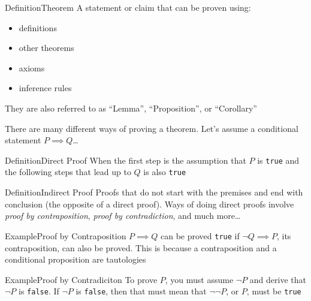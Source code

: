 \documentclass{MathNotes}
\newenvironment{example}[1]{\begin{BlueBox}{Example}{#1}}{\end{BlueBox}}
\newenvironment{definition}[1]{\begin{RedBox}{Definition}{#1}}{\end{RedBox}}
\begin{document}
\begin{definition}{Theorem}\label{def:theorem}
	A statement or claim that can be proven using:
	\begin{itemize}
		\item definitions
		\item other theorems
		\item axioms
		\item inference rules
	\end{itemize}
	They are also referred to as ``Lemma'', ``Proposition'', or ``Corollary''
\end{definition}
There are many different ways of proving a theorem. Let's assume a conditional statement $P\implies Q$\ldots
\begin{multicols}{2}
	\begin{definition}{Direct Proof}\label{def:direct-proof}
		When the first step is the assumption that $P$ is
		\texttt{true} and the following steps that lead up to $Q$ is also \texttt{true}
	\end{definition}

	\begin{definition}{Indirect Proof}\label{def:indirect-proof}
		Proofs that do not start with the premises and end with conclusion (the opposite of a direct proof). Ways of doing direct proofs involve \textit{proof by contraposition}, \textit{proof by contradiction}, and much more\ldots
	\end{definition}

	\begin{example}{Proof by Contraposition}\label{ex:contraposition-proof}
		$P\implies Q$ can be proved \texttt{true} if $\lnot Q\implies P$, its contraposition, can also be proved. This is because a contraposition and a conditional proposition are tautologies
	\end{example}

	\begin{example}{Proof by Contradiciton}\label{ex:contradiciton-proof}
		To prove $P$, you must assume $\lnot P$ and derive that $\lnot P$ is \texttt{false}. If $\lnot P$ is \texttt{false}, then that must mean that $\lnot\lnot P$, or $P$, must be \texttt{true}
	\end{example}
\end{multicols}

\newpage
\end{document}
